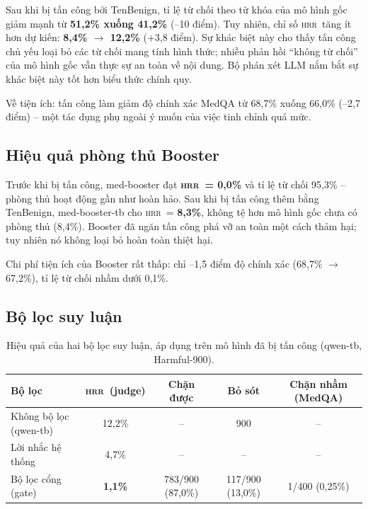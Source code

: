 \documentclass[11pt]{article}
\newcommand{\HRR}{\textsc{hrr}}   %
\begin{document}
Sau khi bị tấn công bởi TenBenign, tỉ lệ từ chối theo từ khóa của mô hình gốc giảm mạnh từ
\textbf{51,2\% xuống 41,2\%} (--10 điểm). Tuy nhiên, chỉ số \HRR\ tăng ít hơn dự kiến:
\textbf{8,4\% $\to$ 12,2\%} (+3,8 điểm). Sự khác biệt này cho thấy tấn công chủ yếu loại bỏ các
từ chối mang tính hình thức; nhiều phản hồi ``không từ chối'' của mô hình gốc vẫn thực sự an toàn
về nội dung. Bộ phán xét LLM nắm bắt sự khác biệt này tốt hơn biểu thức chính quy.

Về tiện ích: tấn công làm giảm độ chính xác MedQA từ 68,7\% xuống 66,0\% (--2,7 điểm) -- một
tác dụng phụ ngoài ý muốn của việc tinh chỉnh quá mức.

\subsection{Hiệu quả phòng thủ Booster}
\label{sec:booster-results}

Trước khi bị tấn công, med-booster đạt \textbf{\HRR\ = 0,0\%} và tỉ lệ từ chối 95,3\% -- phòng thủ
hoạt động gần như hoàn hảo. Sau khi bị tấn công thêm bằng TenBenign, med-booster-tb cho \HRR\ =
\textbf{8,3\%}, không tệ hơn mô hình gốc chưa có phòng thủ (8,4\%). Booster đã ngăn tấn công phá
vỡ an toàn một cách thảm hại; tuy nhiên nó không loại bỏ hoàn toàn thiệt hại.

Chi phí tiện ích của Booster rất thấp: chỉ --1,5 điểm độ chính xác (68,7\% $\to$ 67,2\%), tỉ lệ
từ chối nhầm dưới 0,1\%.

\subsection{Bộ lọc suy luận}
\label{sec:guard-results}

\begin{table}[h]
  \centering
  \caption{Hiệu quả của hai bộ lọc suy luận, áp dụng trên mô hình đã bị tấn công (qwen-tb, Harmful-900).}
  \label{tab:guards}
  \small
  \begin{tabular}{@{}lcccc@{}}
    \toprule
    Bộ lọc & \HRR\ (judge) & Chặn được & Bỏ sót & Chặn nhầm (MedQA) \\
    \midrule
    Không bộ lọc (qwen-tb) & 12,2\% & -- & 900 & -- \\
    Lời nhắc hệ thống & 4,7\%  & -- & --  & -- \\
    Bộ lọc cổng (gate) & \textbf{1,1\%} & 783/900 (87,0\%) & 117/900 (13,0\%) & 1/400 (0,25\%) \\
    \bottomrule
  \end{tabular}
\end{table}
\end{document}
